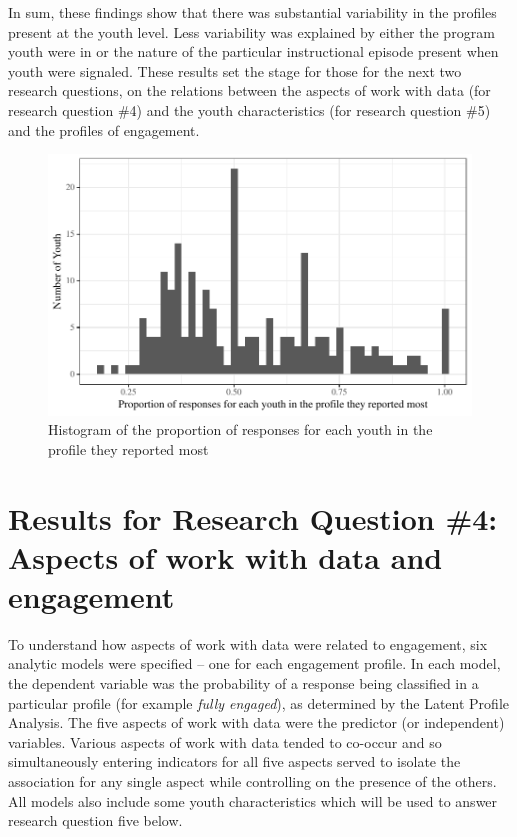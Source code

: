 \documentclass[]{book}
\theoremstyle{definition}
\theoremstyle{definition}
\theoremstyle{definition}
\theoremstyle{remark}
\begin{document}
In sum, these findings show that there was substantial variability in
the profiles present at the youth level. Less variability was explained
by either the program youth were in or the nature of the particular
instructional episode present when youth were signaled. These results
set the stage for those for the next two research questions, on the
relations between the aspects of work with data (for research question
\#4) and the youth characteristics (for research question \#5) and the
profiles of engagement.

\begin{figure}

{\centering \includegraphics[width=0.8\linewidth]{rosenberg-dissertation_files/figure-latex/unnamed-chunk-15-1} 

}

\caption{Histogram of the proportion of responses for each youth in the profile they reported most}\label{fig:unnamed-chunk-15}
\end{figure}

\section{Results for Research Question \#4: Aspects of work with data
and
engagement}\label{results-for-research-question-4-aspects-of-work-with-data-and-engagement}

To understand how aspects of work with data were related to engagement,
six analytic models were specified -- one for each engagement profile.
In each model, the dependent variable was the probability of a response
being classified in a particular profile (for example \emph{fully
engaged}), as determined by the Latent Profile Analysis. The five
aspects of work with data were the predictor (or independent) variables.
Various aspects of work with data tended to co-occur and so
simultaneously entering indicators for all five aspects served to
isolate the association for any single aspect while controlling on the
presence of the others. All models also include some youth
characteristics which will be used to answer research question five
below.
\end{document}
